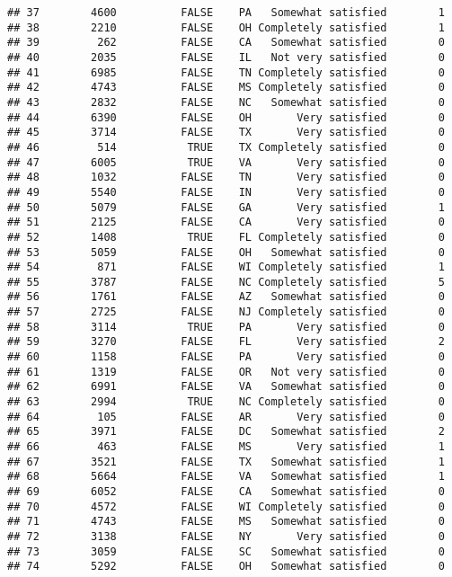 \documentclass[]{book}
\theoremstyle{definition}
\theoremstyle{definition}
\theoremstyle{remark}
\begin{document}
\begin{verbatim}
## 37        4600          FALSE    PA   Somewhat satisfied        1
## 38        2210          FALSE    OH Completely satisfied        1
## 39         262          FALSE    CA   Somewhat satisfied        0
## 40        2035          FALSE    IL   Not very satisfied        0
## 41        6985          FALSE    TN Completely satisfied        0
## 42        4743          FALSE    MS Completely satisfied        0
## 43        2832          FALSE    NC   Somewhat satisfied        0
## 44        6390          FALSE    OH       Very satisfied        0
## 45        3714          FALSE    TX       Very satisfied        0
## 46         514           TRUE    TX Completely satisfied        0
## 47        6005           TRUE    VA       Very satisfied        0
## 48        1032          FALSE    TN       Very satisfied        0
## 49        5540          FALSE    IN       Very satisfied        0
## 50        5079          FALSE    GA       Very satisfied        1
## 51        2125          FALSE    CA       Very satisfied        0
## 52        1408           TRUE    FL Completely satisfied        0
## 53        5059          FALSE    OH   Somewhat satisfied        0
## 54         871          FALSE    WI Completely satisfied        1
## 55        3787          FALSE    NC Completely satisfied        5
## 56        1761          FALSE    AZ   Somewhat satisfied        0
## 57        2725          FALSE    NJ Completely satisfied        0
## 58        3114           TRUE    PA       Very satisfied        0
## 59        3270          FALSE    FL       Very satisfied        2
## 60        1158          FALSE    PA       Very satisfied        0
## 61        1319          FALSE    OR   Not very satisfied        0
## 62        6991          FALSE    VA   Somewhat satisfied        0
## 63        2994           TRUE    NC Completely satisfied        0
## 64         105          FALSE    AR       Very satisfied        0
## 65        3971          FALSE    DC   Somewhat satisfied        2
## 66         463          FALSE    MS       Very satisfied        1
## 67        3521          FALSE    TX   Somewhat satisfied        1
## 68        5664          FALSE    VA   Somewhat satisfied        1
## 69        6052          FALSE    CA   Somewhat satisfied        0
## 70        4572          FALSE    WI Completely satisfied        0
## 71        4743          FALSE    MS   Somewhat satisfied        0
## 72        3138          FALSE    NY       Very satisfied        0
## 73        3059          FALSE    SC   Somewhat satisfied        0
## 74        5292          FALSE    OH   Somewhat satisfied        0

\end{verbatim}
\end{document}
